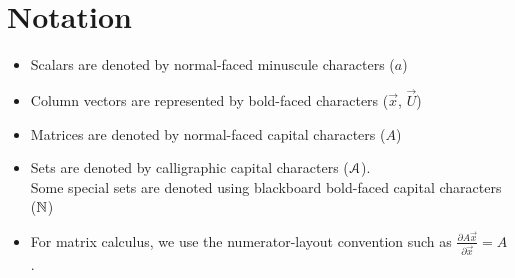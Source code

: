 \documentclass[../main.tex]{subfiles}
\begin{document}
\chapter*{Notation}
\adjustmtc
\begin{itemize}
  \item Scalars are denoted by normal-faced minuscule characters ($a$)
  \item Column vectors are represented by bold-faced characters ($\vec{x}$, $\vec{U}$)
  \item Matrices are denoted by normal-faced capital characters ($A$)
  \item Sets are denoted by calligraphic capital characters ($\mathcal{A}$).
        \\Some special sets are denoted using blackboard bold-faced capital characters ($\mathbb{N}$)
  \item For matrix calculus, we use the numerator-layout convention such as $\frac{\partial A\vec{x}}{\partial\vec{x}}=A$.
\end{itemize}

\end{document}
